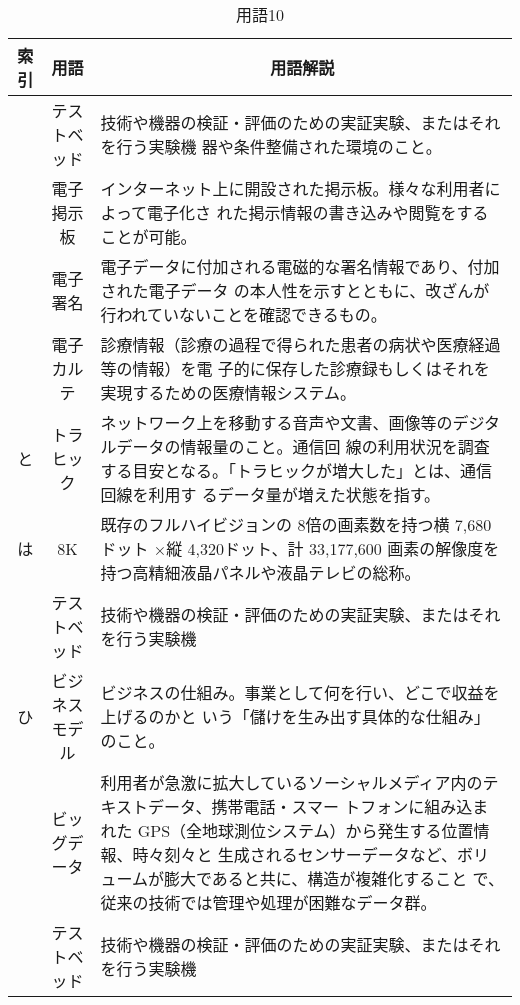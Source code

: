 \begin{table}[htb]
  \begin{center}
    \caption{用語10}
    \begin{tabular}{|c|c|p{12cm}|}
      \hline
      索引 & 用語 & \multicolumn{1}{c|}{用語解説} \\
      \hline
      & テストベッド & 技術や機器の検証・評価のための実証実験、またはそれを行う実験機
      器や条件整備された環境のこと。 \\
      \cline{2-3}
      & 電子掲示板 & インターネット上に開設された掲示板。様々な利用者によって電子化さ
      れた掲示情報の書き込みや閲覧をすることが可能。 \\
      \cline{2-3}
      & 電子署名 & 電子データに付加される電磁的な署名情報であり、付加された電子データ
      の本人性を示すとともに、改ざんが行われていないことを確認できるもの。 \\
      \cline{2-3}
      & 電子カルテ & 診療情報（診療の過程で得られた患者の病状や医療経過等の情報）を電
      子的に保存した診療録もしくはそれを実現するための医療情報システム。\\
      \hline
      と & トラヒック &
      ネットワーク上を移動する音声や文書、画像等のデジタルデータの情報量のこと。通信回
      線の利用状況を調査する目安となる。「トラヒックが増大した」とは、通信回線を利用す
      るデータ量が増えた状態を指す。 \\
      \hline
      は & 8K & 既存のフルハイビジョンの 8倍の画素数を持つ横 
      7,680ドット ×縦 4,320ドット、計 33,177,600
      画素の解像度を持つ高精細液晶パネルや液晶テレビの総称。 \\
      \cline{2-3}
      & テストベッド & 技術や機器の検証・評価のための実証実験、またはそれを行う実験機
      \\
      \hline
      ひ & 
      ビジネスモデル & ビジネスの仕組み。事業として何を行い、どこで収益を上げるのかと
      いう「儲けを生み出す具体的な仕組み」のこと。 \\
      \cline{2-3}
      & ビッグデータ & 
      利用者が急激に拡大しているソーシャルメディア内のテキストデータ、携帯電話・スマー
      トフォンに組み込まれた GPS（全地球測位システム）から発生する位置情報、時々刻々と
      生成されるセンサーデータなど、ボリュームが膨大であると共に、構造が複雑化すること
      で、従来の技術では管理や処理が困難なデータ群。 \\
      \cline{2-3}
      & テストベッド & 技術や機器の検証・評価のための実証実験、またはそれを行う実験機
      \\
      \hline
    \end{tabular}
  \end{center}
\end{table}

